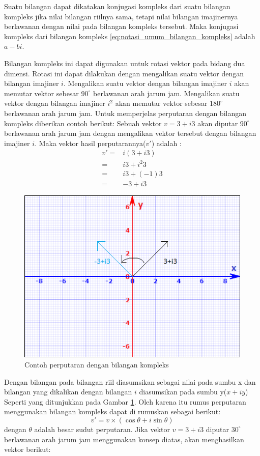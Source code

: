 \documentclass[a4paper,twoside]{article}
\begin{document}
\begin{enumerate}
Suatu bilangan dapat dikatakan konjugasi kompleks dari suatu bilangan kompleks jika nilai bilangan riilnya sama, tetapi nilai bilangan imajinernya berlawanan dengan nilai pada bilangan kompleks tersebut. Maka konjugasi kompleks dari bilangan kompleks \ref{eq:notasi_umum_bilangan_kompleks} adalah \(a-bi\). 

Bilangan kompleks ini dapat digunakan untuk rotasi vektor pada bidang dua dimensi. Rotasi ini dapat dilakukan dengan mengalikan suatu vektor dengan bilangan imajiner $i$. Mengalikan suatu vektor dengan bilangan imajiner $i$ akan memutar vektor sebesar $90^{\circ}$ berlawanan arah jarum jam. Mengalikan suatu vektor dengan bilangan imajiner $i^2$ akan memutar vektor sebesar $180^{\circ}$ berlawanan arah jarum jam. Untuk memperjelas perputaran dengan bilangan kompleks diberikan contoh berikut:
Sebuah vektor $v = 3 + i3$ akan diputar $90^{\circ}$ berlawanan arah jarum jam dengan mengalikan vektor tersebut dengan bilangan imajiner $i$. Maka vektor hasil perputarannya($v'$) adalah :
\begin{equation}
	\begin{split}
		v' = &i(3 + i3)\\
		= & i3 + i^2 3\\
		= & i3 + (-1) 3\\
		= & -3 + i3
	\end{split}
\label{eq:rotasi_kompleks}
\end{equation}
\begin{figure}[htbp]
\centering
\includegraphics[scale=1]{Gambar/diagram-rotasi-kompleks.png}
\caption{Contoh perputaran dengan bilangan kompleks} 
\label{fig:diagram-rotasi-kompleks}
\end{figure}
Dengan bilangan pada bilangan riil diasumsikan sebagai nilai pada sumbu x dan bilangan yang dikalikan dengan bilangan $i$ diasumsikan pada sumbu y($x + iy$) Seperti yang ditunjukkan pada Gambar \ref{fig:diagram-rotasi-kompleks}. Oleh karena itu rumus perputaran menggunakan bilangan kompleks dapat di rumuskan sebagai berikut: 
\[
	v' = v\times(\cos \theta + i \sin \theta)
\]
dengan $\theta$ adalah besar sudut perputaran. Jika vektor $v = 3 + i3$ diputar $30^{\circ}$ berlawanan arah jarum jam menggunakan konsep diatas, akan menghasilkan vektor berikut:


\end{enumerate}
\end{document}
